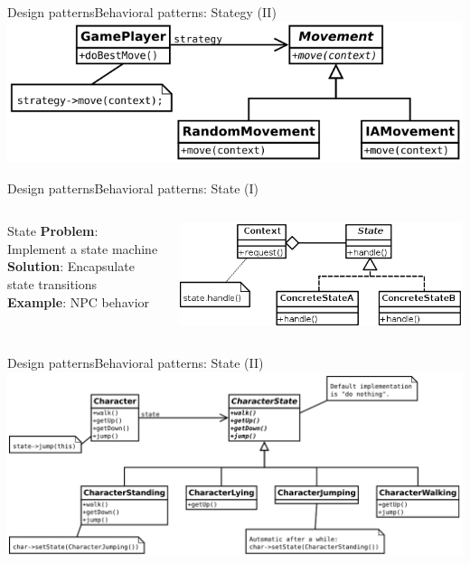 \documentclass[10pt,compress]{beamer} %
\begin{document}
\begin{frame}[plain]{Design patterns}{Behavioral patterns: Stategy (II)}
	\centering\includegraphics[width=0.8\linewidth]{figs/strategygame}
\end{frame}

\begin{frame}{Design patterns}{Behavioral patterns: State (I)}
    \begin{columns}
	   \begin{block}{State}
			\textbf{Problem}: Implement a state machine\\
			\textbf{Solution}: Encapsulate state transitions\\
			\textbf{Example}: NPC behavior\\
		\end{block}
			\centering\includegraphics[width=\linewidth]{figs/state}\\
	\end{columns}
\end{frame}

\begin{frame}{Design patterns}{Behavioral patterns: State (II)}
			\centering\includegraphics[width=\linewidth]{figs/stategame}
\end{frame}
\end{document}
